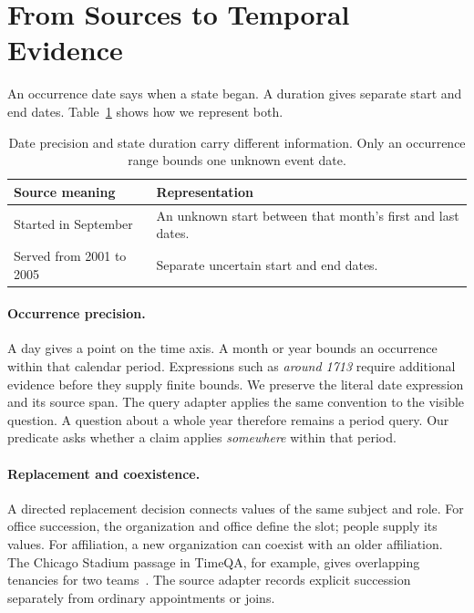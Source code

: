 \section{From Sources to Temporal Evidence}
\label{sec:sources}

An occurrence date says when a state began.
A duration gives separate start and end dates.
Table~\ref{tab:date-types} shows how we represent both.

\begin{table}[b]
\centering\small
\begin{tabular}{@{}p{}p{}@{}}
\toprule
Source meaning & Representation\\
\midrule
Started in September & An unknown start between that month's first and last dates.\\[3pt]
Served from 2001 to 2005 & Separate uncertain start and end dates.\\
\bottomrule
\end{tabular}
\caption{Date precision and state duration carry different information. Only an occurrence range bounds one unknown event date.}
\label{tab:date-types}
\end{table}

\paragraph{Occurrence precision.}
A day gives a point on the time axis.
A month or year bounds an occurrence within that calendar period.
Expressions such as \emph{around 1713} require additional evidence before they supply finite bounds.
We preserve the literal date expression and its source span.
The query adapter applies the same convention to the visible question.
A question about a whole year therefore remains a period query.
Our predicate asks whether a claim applies \emph{somewhere} within that period.

\paragraph{Replacement and coexistence.}
A directed replacement decision connects values of the same subject and role.
For office succession, the organization and office define the slot; people supply its values.
For affiliation, a new organization can coexist with an older affiliation.
The Chicago Stadium passage in TimeQA, for example, gives overlapping tenancies for two teams~\citep{chen2021timeqa}.
The source adapter records explicit succession separately from ordinary appointments or joins.

